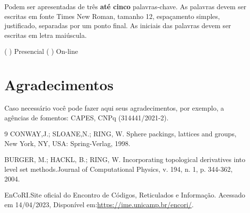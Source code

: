 \documentclass{semat}
\begin{document}
\vspace{1.5em}

 Podem ser apresentadas de três \textbf{até cinco} palavras-chave. As palavras devem ser escritas em fonte Times New Roman, tamanho 12, espaçamento simples, justificado, separadas por um ponto final. As iniciais das palavras devem ser escritas em letra maiúscula.
\vspace{1.5em}

 ( ) Presencial  ( ) On-line

\vspace{1.5em}

\section*{Agradecimentos} %
Caso necessário você pode fazer aqui seus agradecimentos, por exemplo, a agências de fomentos: CAPES, CNPq (314441/2021-2).



\begin{thebibliography}{9}
CONWAY,J.; SLOANE,N.; RING, W. 
Sphere packings, lattices and groups,
  New York, NY, USA: Spring-Verlag, 1998.

BURGER, M.; HACKL, B.; RING, W. Incorporating topological derivatives into level set methods.Journal of Computational Physics, v. 194, n. 1, p. 344-362, 2004.

  EnCoRI.Site oficial do Encontro de Códigos, Reticulados e Informação. Acessado em 14/04/2023, Disponível em:\url{https://ime.unicamp.br/encori/}.
\end{thebibliography}
\end{document}
